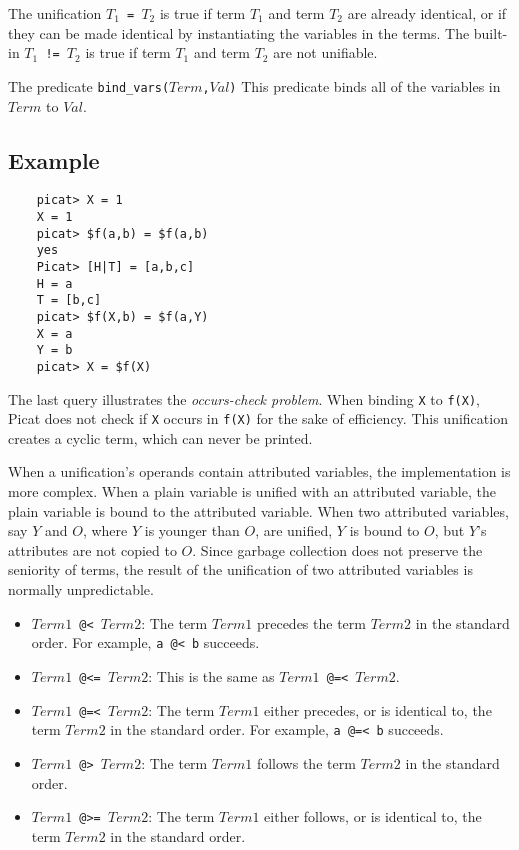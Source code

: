 The unification \texttt{$T_1$ = $T_2$}  is true if term $T_1$ and term $T_2$ are already identical, or if they can be made identical by instantiating the variables in the terms. The built-in \texttt{$T_1$ != $T_2$} is true if term $T_1$ and term $T_2$ are not unifiable.

The predicate \texttt{bind\_vars($Term$,$Val$)}  This predicate binds all of the variables in $Term$ to $Val$.

\subsection*{Example}
\begin{verbatim}
    picat> X = 1
    X = 1
    picat> $f(a,b) = $f(a,b)
    yes
    Picat> [H|T] = [a,b,c]
    H = a
    T = [b,c]
    picat> $f(X,b) = $f(a,Y)
    X = a
    Y = b
    picat> X = $f(X)
\end{verbatim}
The last query illustrates the \emph{occurs-check problem}. When binding \texttt{X} to \texttt{f(X)}, Picat does not check if \texttt{X} occurs in \texttt{f(X)} for the sake of efficiency. This unification creates a cyclic term, which can never be printed.

When a unification's operands contain attributed variables, the implementation is more complex. When a plain variable is unified with an attributed variable, the plain variable is bound to the attributed variable. When two attributed variables, say $Y$ and $O$, where $Y$ is younger than $O$, are unified,  $Y$ is bound to $O$, but $Y$'s attributes are not copied to $O$. Since garbage collection does not preserve the seniority of terms, the result of the unification of two attributed variables is normally unpredictable.

\begin{itemize}
\item \texttt{$Term1$ @< $Term2$}: The term $Term1$ precedes the term $Term2$ in the standard order. For example, \texttt{a @< b} succeeds.
\item \texttt{$Term1$ @<= $Term2$}: This is the same as \texttt{$Term1$ @=< $Term2$}.
\item \texttt{$Term1$ @=< $Term2$}: The term $Term1$ either precedes, or is identical to, the term $Term2$ in the standard order. For example, \texttt{a @=< b} succeeds.
\item \texttt{$Term1$ @> $Term2$}: The term $Term1$ follows the term $Term2$ in the standard order.
\item \texttt{$Term1$ @>= $Term2$}: The term $Term1$ either follows, or is identical to, the term $Term2$ in the standard order.
\end{itemize}

